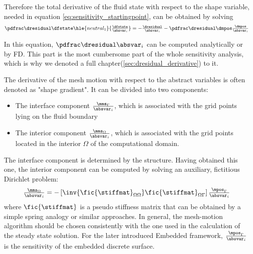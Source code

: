 \documentclass[../main.tex]{subfiles}
\begin{document}
Therefore the total derivative of the fluid state with respect to the shape variable, needed in equation \eqref{eq:sensitivity_startingpoint}, can be obtained by solving
\begin{align}\label{eq:dfstate_by_absvarI}
\PdresidualBYdfstate    \hle{neutral_1}{\DdfstateBYabsvarI}=
-\DdresidualBYabsvarI 
-\PdresidualBYdmms       \DdmmsBYabsvarI
\end{align}


In this equation, $\PdresidualBYabsvarI$ can be computed analytically or by \ac{FD}.
This part is the most cumbersome part of the whole sensitivity analysis, which is why we denoted a full chapter(\ref{sec:dresidual_derivative}) to it.

The derivative of the mesh motion with respect to the abstract variables is often denoted as "shape gradient". It can be divided into two components:
\begin{itemize}
\item The interface component $\tfrac{\mms_\Gamma}{\absvar_i}$, which is associated with the grid points lying on the fluid boundary
\item The interior component $\tfrac{\mms_\Omega}{\absvar_i}$, which is associated with the grid points located in the interior $\Omega$ of the computational domain.
\end{itemize}
The interface component is determined by the structure. Having obtained this one, the interior component can be computed by solving an auxiliary, fictitious Dirichlet problem:
\begin{align}
\tfrac{\mms_\Omega}{\absvar_i}=-\left[\inv{\fic{\stiffmat}_{\Omega\Omega}} \fic{\stiffmat}_{\Omega\Gamma}\right] \tfrac{\mpos_\Gamma}{\absvar_i}
\end{align}
where $\fic{\stiffmat}$ is a pseudo stiffness matrix that can be obtained by a simple spring analogy or similar approaches.
In general, the mesh-motion algorithm should be chosen consistently with the one used in the calculation of the steady state solution.
For the later introduced Embedded framework, $\tfrac{\mpos_\Gamma}{\absvar_i}$ is the sensitivity of the embedded discrete surface.
 \\
 
\end{document}
